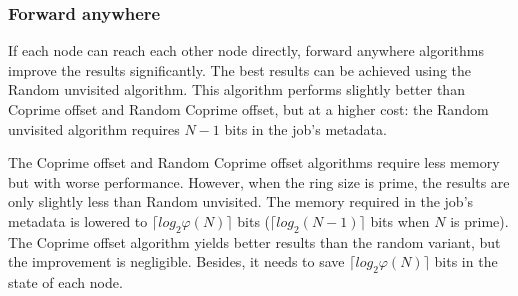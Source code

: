 \documentclass[10pt,a4paper]{article}
\begin{document}
\subsubsection*{Forward anywhere}
If each node can reach each other node directly, forward anywhere algorithms improve the results significantly. The best results can be achieved using the Random unvisited algorithm. This algorithm performs slightly better than Coprime offset and Random Coprime offset, but at a higher cost: the Random unvisited algorithm requires $N-1$ bits in the job's metadata.

The Coprime offset and Random Coprime offset algorithms require less memory but with worse performance. However, when the ring size is prime, the results are only slightly less than Random unvisited. The memory required in the job's metadata is lowered to $\lceil log_2 \varphi(N) \rceil$ bits ($\lceil log_2 (N-1) \rceil$ bits when $N$ is prime). The Coprime offset algorithm yields better results than the random variant, but the improvement is negligible. Besides, it needs to save $\lceil log_2 \varphi(N) \rceil$ bits in the state of each node.
\end{document}
